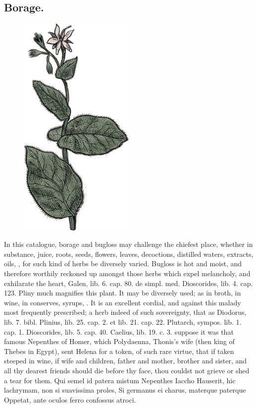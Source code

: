 {\subsection{Borage.}
\begin{figure}
\includegraphics[keepaspectratio,width=0.5\textwidth]{figures/buglossa-small.jpg}
\caption{}
\label{fig:buglosa}
\end{figure}
In this catalogue, borage and bugloss may challenge the
chiefest place, whether in substance, juice, roots, seeds, flowers,
leaves, decoctions, distilled waters, extracts, oils, \etc{}, for such
kind of herbs be diversely varied. Bugloss is hot and moist, and
therefore worthily reckoned up amongst those herbs which expel
melancholy, and  exhilarate the heart, Galen, lib. 6. cap. 80. de
simpl. med. Dioscorides, lib. 4. cap. 123. Pliny much magnifies this
plant. It may be diversely used; as in broth, in wine, in
conserves, syrups, \etc{}. It is an excellent cordial, and against this
malady most frequently prescribed; a herb indeed of such sovereignty,
that as Diodorus, lib. 7. bibl. Plinius, lib. 25. cap. 2. et lib. 21.
cap. 22. Plutarch, sympos. lib. 1. cap. 1. Dioscorides, lib. 5. cap.
40. Caelius, lib. 19. c. 3. suppose it was that famous Nepenthes of
Homer, which Polydaenna, Thonis's wife (then king of Thebes in
Egypt), sent Helena for a token, of such rare virtue, that if taken
steeped in wine, if wife and children, father and mother, brother and
sister, and all thy dearest friends should die before thy face, thou
couldst not grieve or shed a tear for them.
Qui semel id patera mistum Nepenthes Iaccho
Hauserit, hic lachrymam, non si suavissima proles,
Si germanus ei charus, materque paterque
Oppetat, ante oculos ferro confossus atroci.

}
